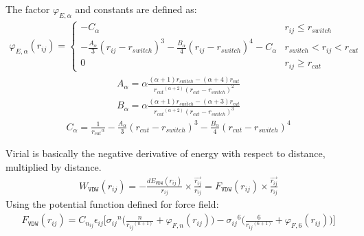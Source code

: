 \documentclass[letterpaper,10pt,english]{sphinxmanual}
\begin{document}
\begin{description}
The factor \(\varphi_{E, \alpha}\) and constants are defined as:
\begin{equation*}
\begin{split}\varphi_{E, \alpha}(r_{ij}) =
\begin{cases}
  -C_{\alpha} & r_{ij} \leq r_{switch} \\
  -\frac{A_{\alpha}}{3} (r_{ij} - r_{switch})^3 -\frac{B_{\alpha}}{4} (r_{ij} - r_{switch})^4 - C_{\alpha} & r_{switch} < r_{ij} < r_{cut} \\
  0 & r_{ij} \geq r_{cut}
\end{cases}\end{split}
\end{equation*}\begin{equation*}
\begin{split}A_{\alpha} = \alpha \frac{(\alpha + 1) r_{switch} - (\alpha +4) r_{cut}} {{r_{cut}}^{(\alpha + 2)} {(r_{cut} - r_{switch})}^2}\end{split}
\end{equation*}\begin{equation*}
\begin{split}B_{\alpha} = \alpha \frac{(\alpha + 1) r_{switch} - (\alpha +3) r_{cut}} {{r_{cut}}^{(\alpha + 2)} {(r_{cut} - r_{switch})}^3}\end{split}
\end{equation*}\begin{equation*}
\begin{split}C_{\alpha} =  \frac{1}{{r_{cut}}^{\alpha}} -\frac{A_{\alpha}}{3} (r_{cut} - r_{switch})^3 -\frac{B_{\alpha}}{4} (r_{cut} - r_{switch})^4\end{split}
\end{equation*}
\item[{\sphinxcode{\sphinxupquote{Virial Calculation}}}] \leavevmode
Virial is basically the negative derivative of energy with respect to distance, multiplied by distance.
\begin{equation*}
\begin{split}W_{\texttt{VDW}}(r_{ij}) = -\frac{dE_{\texttt{VDW}}(r_{ij})}{r_{ij}}\times \frac{\overrightarrow{r_{ij}}}{{r_{ij}}} = F_{\texttt{VDW}}(r_{ij}) \times \frac{\overrightarrow{r_{ij}}}{{r_{ij}}}\end{split}
\end{equation*}
Using the  potential function defined for  force field:
\begin{equation*}
\begin{split}F_{\texttt{VDW}}(r_{ij}) = C_{n_{ij}}\epsilon_{ij} \Bigg[ {\sigma_{ij}}^{n} \bigg(\frac{n}{{r_{ij}}^{(n+1)}} + \varphi_{F, n} (r_{ij}) \bigg) - {\sigma_{ij}}^{6} \bigg(\frac{6}{{r_{ij}}^{(6+1)}} + \varphi_{F, 6} (r_{ij}) \bigg) \Bigg]\end{split}

\end{equation*}
\end{description}
\end{document}

